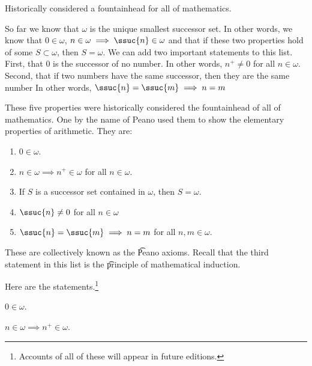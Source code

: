 

Historically considered a fountainhead for all of mathematics.


So far we know that $\omega$ is the unique smallest successor set.
In other words, we know that $0 \in \omega$, $n \in \omega \implies \ssuc{n} \in \omega$ and that if these two properties hold of some $S \subset \omega$, then $S = \omega$.
We can add two important statements to this list.
First, that 0 is the successor of no number.
In other words, $n^+ \neq 0$ for all $n \in \omega$.
Second, that if two numbers have the same successor, then they are the same number
In other words, $\ssuc{n} = \ssuc{m} \implies n = m$

These five properties were historically considered the fountainhead of all of mathematics.
One by the name of Peano used them to show the elementary properties of arithmetic.
They are:

\begin{enumerate}
  \item $0 \in \omega$.
  \item $n \in \omega \implies n^+ \in \omega$ for all $n \in \omega$.
  \item If $S$ is a successor set contained in $\omega$, then $S = \omega$.
  \item $\ssuc{n} \neq 0$ for all $n \in \omega$
  \item $\ssuc{n} = \ssuc{m} \implies n = m$ for all $n, m \in \omega$.
\end{enumerate}

These are collectively known as the \t{Peano axioms}.
Recall that the third statement in this list is the \t{principle of mathematical induction}.


Here are the statements.\footnote{Accounts of all of these will appear in future editions.}

\begin{proposition}
  $0 \in \omega$.
\end{proposition}

\begin{proposition}
  $n \in \omega \implies n^+ \in \omega$.
\end{proposition}

